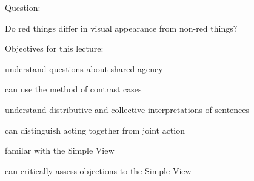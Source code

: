 \documentclass[12pt]{extarticle}
\begin{document}
\begin{multicols*}{3}
Question:



Do red things differ in visual appearance from non-red things?


Objectives for this lecture:

understand questions about shared agency


can use the method of contrast cases


understand distributive and collective interpretations of sentences


can distinguish acting together from joint action


familar with the Simple View


can critically assess objections to the Simple View






\footnotesize


\end{multicols*}
\end{document}
